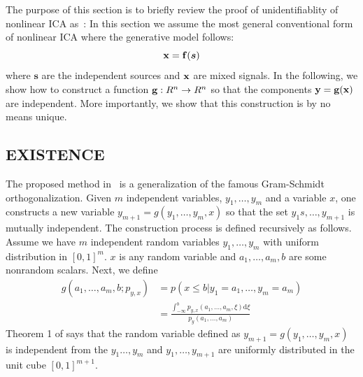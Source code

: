 \documentclass[letterpaper]{article}
\theoremstyle{definition}
\begin{document}
The purpose of this section is to briefly review the proof of unidentifiablity of nonlinear ICA as~\cite{hyvarinen1999nonlinear}:
In this section we assume the most general conventional form of nonlinear ICA where the generative model follows:
\begin{equation}
    \label{eq:nonlinear_ica_noiseless}
    \mathbf{x}=\mathbf{f}(\bm{s})
\end{equation}
where $\bm{s}$ are the independent sources and $\mathbf{x}$ are mixed signals. In the following, we show how to construct a function $\mathbf{g}:R^n\to R^n$ so that the components $\mathbf{y}=\mathbf{g}(\mathbf{x})$ are independent. More importantly, we show that this construction is by no means unique.
\subsection{EXISTENCE}
The proposed method in~\cite{hyvarinen1999nonlinear} is a generalization of the famous Gram-Schmidt orthogonalization. Given $m$ independent variables, $y_1,\ldots,y_m$ and a variable $x$, one constructs a new variable $y_{m+1}=g(y_1,\ldots,y_m,x)$ so that the set $y_1s,\ldots,y_{m+1}$ is mutually independent. The construction process is defined recursively as follows. Assume we have $m$ independent random variables $y_1,\ldots,y_m$ with uniform distribution in $[0,1]^m$. $x$ is any random variable and $a_1,\ldots, a_m,b$ are some nonrandom scalars. Next, we define
\begin{align}
    g \left( a _ { 1 } , \ldots , a _ { m } , b ; p _ { y , x } \right) &= p ( x \leq b | y _ { 1 } = a _ { 1 } , \ldots , y _ { m } = a _ { m } )\nonumber\\
    &= \frac { \int _ { - \infty } ^ { b } p _ { y , x } \left( a _ { 1 } , \ldots , a _ { m } , \xi \right) \mathrm { d } \xi } { p _ { y } \left( a _ { 1 } , \ldots , a _ { m } \right) }
\end{align}
Theorem 1 of \cite{hyvarinen1999nonlinear} says that the random variable defined as $y_{m+1}=g(y_1,\ldots,y_m,x)$ is independent from the $y_1\ldots,y_m$ and $y_1,\ldots,y_{m+1}$ are uniformly distributed in the unit cube $[0,1]^{m+1}$.
\end{document}
